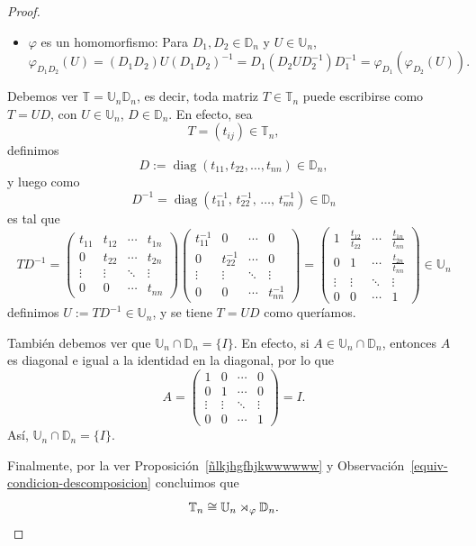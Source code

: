 \begin{proof}
\begin{itemize}
\begin{itemize}
			
			
			
		\end{itemize}
		\item \( \varphi \) es un homomorfismo: Para \( D_1, D_2 \in \mathbb{D}_n \) y \( U \in \mathbb{U}_n \),
		\[
		\varphi_{D_1 D_2}(U) = \left(D_1 D_2\right) U \left(D_1 D_2\right)^{-1} = D_1 \left(D_2 U D_2^{-1}\right) D_1^{-1} = \varphi_{D_1}\left(\varphi_{D_2}(U)\right).
		\]
		
	\end{itemize}
	Debemos ver $\mathbb{T}=\mathbb{U}_n\mathbb{D}_n$, es decir, toda matriz \( T \in \mathbb{T}_n \) puede escribirse como \( T = U D \), con \( U \in \mathbb{U}_n \), \( D \in \mathbb{D}_n \). En efecto, sea
	\[
	T = (t_{ij}) \in \mathbb{T}_n,
	\]
	definimos
	\[
	D := \operatorname{diag}(t_{11}, t_{22}, \dots, t_{nn}) \in \mathbb{D}_n,
	\]
	y luego como \[
	D^{-1} = \operatorname{diag}\left(t_{11}^{-1},\, t_{22}^{-1},\, \dots,\, t_{nn}^{-1}\right)\in \mathbb{D}_n
	\]
	 es tal que 	
	\[
	T D^{-1} = 
	\begin{pmatrix}
		t_{11} & t_{12} & \cdots & t_{1n} \\
		0 & t_{22} & \cdots & t_{2n} \\
		\vdots & \vdots & \ddots & \vdots \\
		0 & 0 & \cdots & t_{nn}
	\end{pmatrix}
	\begin{pmatrix}
		t_{11}^{-1} & 0 & \cdots & 0 \\
		0 & t_{22}^{-1} & \cdots & 0 \\
		\vdots & \vdots & \ddots & \vdots \\
		0 & 0 & \cdots & t_{nn}^{-1}
	\end{pmatrix}
	=
	\begin{pmatrix}
		1 & \frac{t_{12}}{t_{22}} & \cdots & \frac{t_{1n}}{t_{nn}} \\
		0 & 1 & \cdots & \frac{t_{2n}}{t_{nn}} \\
		\vdots & \vdots & \ddots & \vdots \\
		0 & 0 & \cdots & 1
	\end{pmatrix}
	\in \mathbb{U}_n
	\] definimos  \( U:=TD^{-1} \in \mathbb{U}_n \), y se tiene \( T = U D \) como queríamos.
	
	\medskip
	\noindent
	También debemos ver que \( \mathbb{U}_n \cap \mathbb{D}_n = \{I\} \). En efecto,
	si \( A \in \mathbb{U}_n \cap \mathbb{D}_n \), entonces \( A \) es diagonal e igual a la identidad en la diagonal, por lo que
	\[
	A = 
	\begin{pmatrix}
		1 & 0 & \cdots & 0 \\
		0 & 1 & \cdots & 0 \\
		\vdots & \vdots & \ddots & \vdots \\
		0 & 0 & \cdots & 1
	\end{pmatrix}
	= I.
	\]
	Así, \( \mathbb{U}_n \cap \mathbb{D}_n = \{I\} \).
	
	\medskip
	\noindent	
	Finalmente, por la ver Proposición~\ref{ñlkjhgfhjkwwwwww} y Observación~\ref{equiv-condicion-descomposicion} concluimos que
	\[
	\mathbb{T}_n \cong \mathbb{U}_n \rtimes_\varphi \mathbb{D}_n. \qedhere
	\]
\end{proof}


